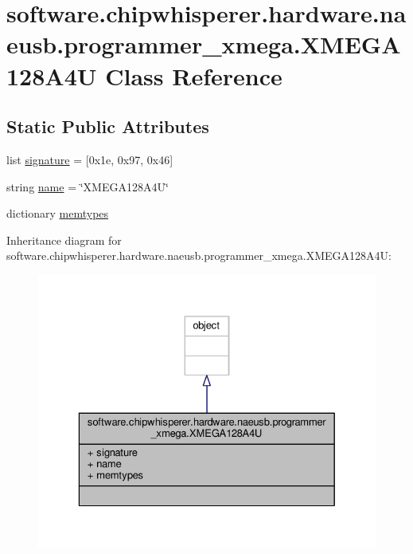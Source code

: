 \hypertarget{classsoftware_1_1chipwhisperer_1_1hardware_1_1naeusb_1_1programmer__xmega_1_1XMEGA128A4U}{}\section{software.\+chipwhisperer.\+hardware.\+naeusb.\+programmer\+\_\+xmega.\+X\+M\+E\+G\+A128\+A4\+U Class Reference}
\label{classsoftware_1_1chipwhisperer_1_1hardware_1_1naeusb_1_1programmer__xmega_1_1XMEGA128A4U}
\subsection*{Static Public Attributes}
\begin{DoxyCompactItemize}
\item 
list \hyperlink{classsoftware_1_1chipwhisperer_1_1hardware_1_1naeusb_1_1programmer__xmega_1_1XMEGA128A4U_a81e4cc30c61f76970ba991da1077976a}{signature} = \mbox{[}0x1e, 0x97, 0x46\mbox{]}
\item 
string \hyperlink{classsoftware_1_1chipwhisperer_1_1hardware_1_1naeusb_1_1programmer__xmega_1_1XMEGA128A4U_ad7fc3995fadd4dbd8f0baefef13994b7}{name} = \char`\"{}X\+M\+E\+G\+A128\+A4\+U\char`\"{}
\item 
dictionary \hyperlink{classsoftware_1_1chipwhisperer_1_1hardware_1_1naeusb_1_1programmer__xmega_1_1XMEGA128A4U_a9ad0d9c9ce317da7ee43bb0923d0da40}{memtypes}
\end{DoxyCompactItemize}


Inheritance diagram for software.\+chipwhisperer.\+hardware.\+naeusb.\+programmer\+\_\+xmega.\+X\+M\+E\+G\+A128\+A4\+U\+:\nopagebreak
\begin{figure}[H]
\begin{center}
\leavevmode
\includegraphics[width=329pt]{de/dde/classsoftware_1_1chipwhisperer_1_1hardware_1_1naeusb_1_1programmer__xmega_1_1XMEGA128A4U__inherit__graph}
\end{center}
\end{figure}


